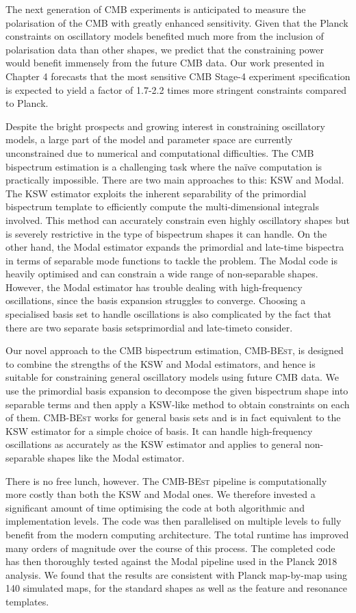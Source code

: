 The next generation of CMB experiments is anticipated to measure the polarisation of the CMB with greatly enhanced sensitivity. Given that the Planck constraints on oscillatory models benefited much more from the inclusion of polarisation data than other shapes, we predict that the constraining power would benefit immensely from the future CMB data. Our work presented in Chapter 4 forecasts that the most sensitive CMB Stage-4 experiment specification is expected to yield a factor of 1.7-2.2 times more stringent constraints compared to Planck.

Despite the bright prospects and growing interest in constraining oscillatory models, a large part of the model and parameter space are currently unconstrained due to numerical and computational difficulties. The CMB bispectrum estimation is a challenging task where the na\"ive computation is practically impossible. There are two main approaches to this: KSW and Modal. The KSW estimator exploits the inherent separability of the primordial bispectrum template to efficiently compute the multi-dimensional integrals involved. This method can accurately constrain even highly oscillatory shapes but is severely restrictive in the type of bispectrum shapes it can handle. On the other hand, the Modal estimator expands the primordial and late-time bispectra in terms of separable mode functions to tackle the problem. The Modal code is heavily optimised and can constrain a wide range of non-separable shapes. However, the Modal estimator has trouble dealing with high-frequency oscillations, since the basis expansion struggles to converge. Choosing a specialised basis set to handle oscillations is also complicated by the fact that there are two separate basis sets\textemdash primordial and late-time\textemdash to consider.

Our novel approach to the CMB bispectrum estimation, \textsc{CMB-BEst}, is designed to combine the strengths of the KSW and Modal estimators, and hence is suitable for constraining general oscillatory models using future CMB data. We use the primordial basis expansion to decompose the given bispectrum shape into separable terms and then apply a KSW-like method to obtain constraints on each of them. \textsc{CMB-BEst} works for general basis sets and is in fact equivalent to the KSW estimator for a simple choice of basis. It can handle high-frequency oscillations as accurately as the KSW estimator and applies to general non-separable shapes like the Modal estimator.

There is no free lunch, however. The \textsc{CMB-BEst} pipeline is computationally more costly than both the KSW and Modal ones. We therefore invested a significant amount of time optimising the code at both algorithmic and implementation levels. The code was then parallelised on multiple levels to fully benefit from the modern computing architecture. The total runtime has improved many orders of magnitude over the course of this process. The completed code has then thoroughly tested against the Modal pipeline used in the Planck 2018 analysis. We found that the results are consistent with Planck map-by-map using 140 simulated maps, for the standard shapes as well as the feature and resonance templates.

